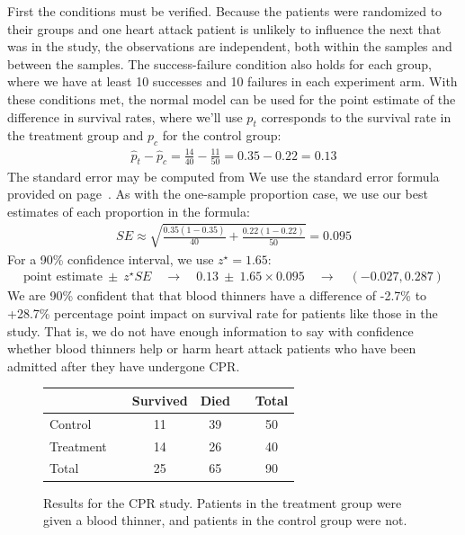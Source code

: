 \begin{examplewrap}
\begin{nexample}
  First the conditions must be verified.
  Because the patients were randomized to their groups
  and one heart attack patient is unlikely to influence
  the next that was in the study, the observations are
  independent, both within the samples and between the
  samples.
  The success-failure condition also holds for each group,
  where we have at least 10 successes and 10 failures in
  each experiment arm.
  With these conditions met, the normal model can be used
  for the point estimate of the difference in survival
  rates, where we'll use $p_t$ corresponds to the survival
  rate in the treatment group and $p_c$ for the control
  group:
  \begin{align*}
  \hat{p}_{t} - \hat{p}_{c}
    = \frac{14}{40} - \frac{11}{50}
    = 0.35 - 0.22
    = 0.13
  \end{align*}
  The standard error may be computed from
  We use the standard error formula provided on
  page~\pageref{seForDiffOfProp}.
  As with the one-sample proportion case,
  we use our best estimates of each proportion in the formula:
  \begin{align*}
  SE \approx \sqrt{\frac{0.35 (1 - 0.35)}{40} +
      \frac{0.22 (1 - 0.22)}{50}}
    = 0.095
  \end{align*}
  For a 90\% confidence interval, we use $z^{\star} = 1.65$:
  \begin{align*}
  \text{point estimate} \ \pm\ z^{\star}SE
    \quad \to \quad 0.13 \ \pm\ 1.65 \times  0.095
    \quad \to \quad (-0.027, 0.287)
  \end{align*}
  We are 90\% confident that that blood thinners have
  a difference of -2.7\% to +28.7\% percentage point
  impact on survival rate for patients like those in
  the study.
  That is, we do not have enough information to say
  with confidence whether blood thinners help or harm
  heart attack patients who have been admitted after
  they have undergone CPR.
\end{nexample}
\end{examplewrap}

\begin{figure}[ht]
\centering
\begin{tabular}{lccccc}
\hline
			&& Survived 	& Died 	&& Total \\
\hline
Control		&& 11		& 39		&& 50 \\
Treatment		&& 14		& 26		&& 40 \\
\hline
Total			&& 25		& 65		&& 90 \\
\hline
\end{tabular}
\caption{Results for the CPR study.
    Patients in the treatment group were given
    a blood thinner, and patients in the control
    group were not.}
\label{resultsForCPRStudyInSmallSampleSection}
\end{figure}

